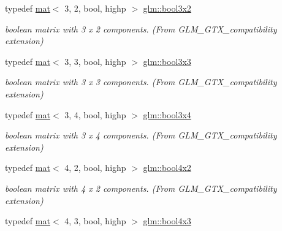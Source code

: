 \begin{DoxyCompactItemize}
typedef \hyperlink{structglm_1_1mat}{mat}$<$ 3, 2, bool, highp $>$ \hyperlink{group__gtx__compatibility_ga24674530ea1f5c4e78ba3932dcd7504a}{glm\+::bool3x2}
\begin{DoxyCompactList}\small\item\em boolean matrix with 3 x 2 components. (From G\+L\+M\+\_\+\+G\+T\+X\+\_\+compatibility extension) \end{DoxyCompactList}\item 
\mbox{\label{group__gtx__compatibility_gac56217a837f277fa163565d9858f66cf}} 
typedef \hyperlink{structglm_1_1mat}{mat}$<$ 3, 3, bool, highp $>$ \hyperlink{group__gtx__compatibility_gac56217a837f277fa163565d9858f66cf}{glm\+::bool3x3}
\begin{DoxyCompactList}\small\item\em boolean matrix with 3 x 3 components. (From G\+L\+M\+\_\+\+G\+T\+X\+\_\+compatibility extension) \end{DoxyCompactList}\item 
\mbox{\label{group__gtx__compatibility_ga3bec11b90dfdd4c6b37af3ae6e8f7c29}} 
typedef \hyperlink{structglm_1_1mat}{mat}$<$ 3, 4, bool, highp $>$ \hyperlink{group__gtx__compatibility_ga3bec11b90dfdd4c6b37af3ae6e8f7c29}{glm\+::bool3x4}
\begin{DoxyCompactList}\small\item\em boolean matrix with 3 x 4 components. (From G\+L\+M\+\_\+\+G\+T\+X\+\_\+compatibility extension) \end{DoxyCompactList}\item 
\mbox{\label{group__gtx__compatibility_gaad9844846cb1d1f74c4b00ddb8e582ef}} 
typedef \hyperlink{structglm_1_1mat}{mat}$<$ 4, 2, bool, highp $>$ \hyperlink{group__gtx__compatibility_gaad9844846cb1d1f74c4b00ddb8e582ef}{glm\+::bool4x2}
\begin{DoxyCompactList}\small\item\em boolean matrix with 4 x 2 components. (From G\+L\+M\+\_\+\+G\+T\+X\+\_\+compatibility extension) \end{DoxyCompactList}\item 
\mbox{\label{group__gtx__compatibility_gab1a5519fb12e67d9940fa4d9b4590198}} 
typedef \hyperlink{structglm_1_1mat}{mat}$<$ 4, 3, bool, highp $>$ \hyperlink{group__gtx__compatibility_gab1a5519fb12e67d9940fa4d9b4590198}{glm\+::bool4x3}

\end{DoxyCompactItemize}
